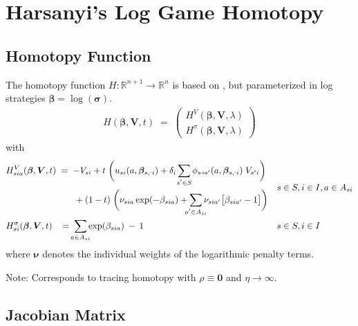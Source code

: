 \documentclass[11pt,fleqn]{article}
\newcommand{\R}{\mathbb{R}}
\newcommand{\bsigma}{\bm{\sigma}}
\newcommand{\bbeta}{\bm{\beta}}
\newcommand{\bV}{\bm{V}}
\newcommand{\bnu}{\bm{\nu}}
\newcommand{\bzero}{\bm{0}}
\newcommand{\shortminus}{{\text{\scalebox{0.4}[1.0]{\(-\)}}}}
\newcommand{\minusi}{\shortminus i}
\newcommand{\shortrightarrow}{\parbox{4pt}{\tikz{\draw[->](0,0)--(4pt,0);}}}
\newcommand{\phiss}{\phi_{s\shortrightarrow s'}}
\begin{document}
\newpage
\section{Harsanyi's Log Game Homotopy}


\subsection*{Homotopy Function}

The homotopy function $H: \R^{n+1} \rightarrow \R^n$ is based on \citet[eqn.~X, p.~Y]{Eibelshaeuseretal2021LogGame}, but parameterized in log strategies $\bbeta = \log(\bsigma)$.
\begin{align*}
	H(\bbeta,\bV,t) \;=\;
	\begin{pmatrix} 
		H^{V}(\bbeta,\bV,\lambda) \\ 
		H^{\sigma}(\bbeta,\bV,\lambda) 
	\end{pmatrix}
\end{align*}
with
\begin{align*}
	& \begin{aligned}
		H^V_{sia}(\bbeta,\bV,t) & \;=\; - V_{si} + t \; \biggl( u_{si}(a,\bbeta_{s,\minusi}) + \delta_i \sum\limits_{\mathclap{s'\in S}} \phiss(a,\bbeta_{s,\minusi}) \; V_{s'i} \biggr) \\
		& \qquad + (1-t) \; \biggl( \nu_{sia} \exp(-\beta_{sia}) + \sum\limits_{\mathclap{a'\in A_{si}}} \nu_{sia'} \bigl[ \beta_{sia'} - 1 \bigr] \biggr)
	\end{aligned} && s\in S, i\in I, a\in A_{si} \\
	& H^\sigma_{si}(\bbeta,\bV,t) \;\; \;=\; \sum\limits_{\mathclap{a\in A_{si}}} \exp(\beta_{sia}) \:-\: 1 && s\in S, i\in I
\end{align*}
where $\bnu$ denotes the individual weights of the logarithmic penalty terms.

Note: Corresponds to tracing homotopy with $\rho \equiv \bzero$ and $\eta \rightarrow \infty$.


\subsection*{Jacobian Matrix}
\end{document}
